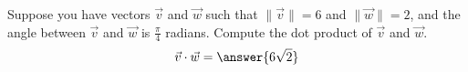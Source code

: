 \begin{problem}
Suppose you have vectors $\vec{v}$ and $\vec{w}$ such that $\|\vec{v}\|=6$ and $\|\vec{w}\|=2$, and the angle between $\vec{v}$ and $\vec{w}$ is $\frac{\pi}{4}$ radians. Compute the dot product of $\vec{v}$ and $\vec{w}$.
\[
\vec{v}\cdot \vec{w} = \answer{6\sqrt{2}}
\]
\end{problem}